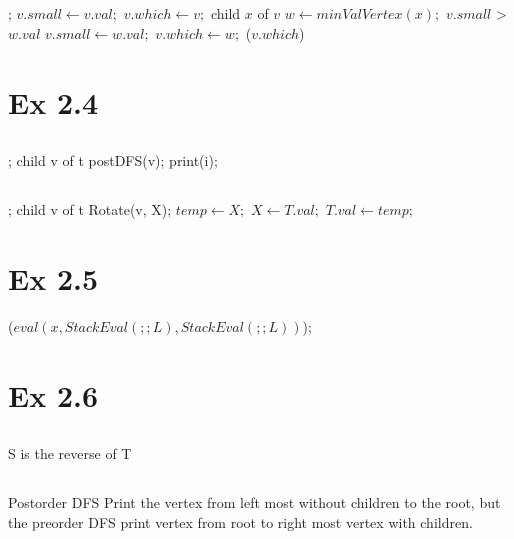 \subsection{}
\Prog\qq  
{}; \p
$v.small \leftarrow v.val;$\p
$v.which \leftarrow v;$\p
\Foreach child $x$ of $v$ \Do\p
$w \leftarrow minValVertex(x);$\p
\If $v.small$ > $w.val$  \Then\p
$v.small \leftarrow w.val;$\p
$v.which \leftarrow w;$\p
\Endif\p
\Endfor\p
\Return($v.which$)\qq
\Fini 


 \section{Ex 2.4}
 
 \subsection{}
  \Prog\qq 
{}; \p
\Foreach child v of t \Do\p
postDFS(v);\p
\Endfor\p
print(i);\qq
\Fini 

\subsection{}

\Prog\qq %
; \p
\Foreach child v of t \Do\p
Rotate(v, X);\p
\Endfor\p
$temp \leftarrow X;$\p
$X \leftarrow T.val;$\p
$T.val \leftarrow temp;$\qq
\Fini 


 \section{Ex 2.5}
\Prog\qq
 \Return($eval(x, StackEval(;; L), StackEval(;; L))$);
 \Fini
 \section{Ex 2.6}
 
 \subsection{}
 
 S is the reverse of T
 \subsection{}
 
 Postorder DFS Print the vertex from left most without children to the root, but the preorder DFS print vertex from root to right most vertex with children.
 
